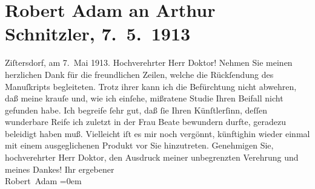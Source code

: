 

         \renewcommand{\erwaehnteOrte}{Orte: Wien, Zistersdorf}
         \renewcommand{\erwaehnteWerke}{Werke: Fatme, Frau Beate und ihr Sohn. Novelle}
               \section[Robert Adam an Arthur Schnitzler, 7. 5. 1913]{ Robert Adam an Arthur Schnitzler, 7. 5. 1913}\nopagebreak{}\rehead{ }\begin{ledgroupsized}[t]{13cm}\normalsize\beginnumbering \toendnotes[C]{\smallbreak\pagebreak[2]} 
\toendnotes[C]{\smallbreak}\pstart
           \raggedleft{}{\pb}Ziſtersdorf, am 7. Mai 1913. \pend
           \pstart{}Hochverehrter Herr Doktor!\pend\pstart
           Nehmen Sie meinen herzlichen Dank für die freundlichen Zeilen, welche die Rückſendung
               des Manuſkripts
               begleiteten.\pend
           \pstart
           Trotz ihrer kann ich die Befürchtung nicht abwehren, daß meine krauſe und, wie ich
               einſehe, mißratene Studie Ihren Beifall nicht gefunden habe. Ich begreife ſehr gut,
               daß ſie Ihren Künſtlerſinn, deſſen wunderbare Reife ich zuletzt in der Frau Beate bewundern durfte, geradezu beleidigt
               haben muß.\pend
           \pstart
           Vielleicht iſt es mir noch vergönnt, künftighin wieder einmal mit einem
               ausgeglichenen Produkt vor Sie hinzutreten.\pend
           \pstart
           Genehmigen Sie, hochverehrter Herr {\pb}Doktor, den
               Ausdruck meiner unbegrenzten Verehrung und meines Dankes!\pend
           \pstart
           Ihr ergebener{\\[\baselineskip]}\spacefill\mbox{Robert Adam}\pend
           \leftskip=0em{}
         
         \endnumbering{}\end{ledgroupsized}  \newcommand{\dateiname}{L02136}\newcommand{\titel}{Robert Adam an Arthur Schnitzler, 7. 5. 1913}\newcommand{\editorInnen}{Martin Anton Müller und Gerd-Hermann Susen}
      